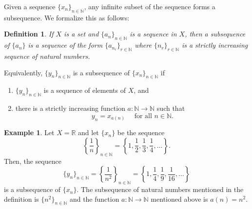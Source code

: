\documentclass[12pt]{article}
\newtheorem*{defn}{Definition}
\theoremstyle{definition}
\newtheorem*{exa}{Example}
\newcommand{\Nats}{\mathbb{N}}
\newcommand{\Reals}{\mathbb{R}}
\begin{document}
Given a sequence $\{x_n\}_{n\in \Nats}$, any infinite subset of the sequence forms a subsequence. We formalize this as follows:

\begin{defn}
If $X$ is a set and $\{a_n\}_{n \in \mathbb{N}}$ is a sequence in $X$, then a \emph{subsequence} of $\{a_n\}$ is a sequence of the form $\{a_{n_r}\}_{r \in \mathbb{N}}$ where $\{n_r\}_{r \in \mathbb{N}}$ is a strictly increasing sequence of natural numbers.
\end{defn}

Equivalently, $\{y_n\}_{n\in \Nats}$ is a subsequence of $\{x_n\}_{n\in \Nats}$ if
\begin{enumerate}
\item $\{y_n\}_{n\in\Nats}$ is a sequence of elements of $X$, and

\item there is a strictly increasing function $a:\Nats \to \Nats$ such that $$y_n = x_{a(n)} \quad \text{ for all } n\in\Nats.$$
\end{enumerate}

\begin{exa}
Let $X=\Reals$ and let $\{x_n\}$ be the sequence 
$$\left\{\frac{1}{n}\right\}_{n\in\Nats}=\left\{1,\frac{1}{2},\frac{1}{3},\frac{1}{4},\ldots\right\}.$$ Then, the sequence $$\{y_n\}_{n\in\Nats}=\left\{\frac{1}{n^2}\right\}_{n\in\Nats}=\left\{1,\frac{1}{4},\frac{1}{9},\frac{1}{16},\ldots\right\}$$
is a subsequence of $\{x_n\}$. The subsequence of natural numbers mentioned in the definition is $\{n^2\}_{n\in\Nats}$ and the function $a:\Nats\to\Nats$ mentioned above is $a(n)=n^2$.
\end{exa}
\end{document}
